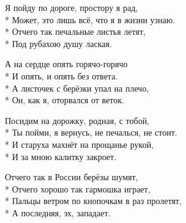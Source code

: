 \medskip

\begin{minipage}{\linewidth}
Я пойду по дороге, простору я рад,\\*
Может, это лишь всё, что я в жизни узнаю.\\*
Отчего так печальные листья летят,\\*
Под рубахою душу лаская.\\
\end{minipage}\par\medskip\nobreak

\medskip

\begin{minipage}{\linewidth}
\hspace*{1.5em}А на сердце опять горячо-горячо\\*
\hspace*{1.5em}И опять, и опять без ответа.\\*
\hspace*{1.5em}А листочек с берёзки упал на плечо,\\*
\hspace*{1.5em}Он, как я, оторвался от веток.\\
\end{minipage}\par\medskip\nobreak

\medskip

\begin{minipage}{\linewidth}
Посидим на дорожку, родная, с тобой,\\*
Ты пойми, я вернусь, не печалься, не стоит.\\*
И старуха махнёт на прощанье рукой,\\*
И за мною калитку закроет.\\
\end{minipage}\par\medskip\nobreak

\medskip

\begin{minipage}{\linewidth}
Отчего так в России берёзы шумят,\\*
Отчего хорошо так гармошка играет,\\*
Пальцы ветром по кнопочкам в раз пролетят,\\*
А последняя, эх, западает.\\
\end{minipage}\par\medskip\nobreak

\medskip

